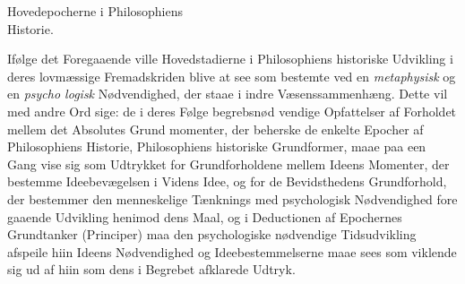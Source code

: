 \begin{center}
{\Large Hovedepocherne i Philosophiens\\
Historie.}
\end{center}

Ifølge det Foregaaende ville Hovedstadierne i Philosophiens
historiske Udvikling i deres lovmæssige Fremadskriden blive
at see som bestemte ved en \emph{metaphysisk} og en \emph{psycho\-%
logisk} Nødvendighed, der staae i indre Væsenssammenhæng.
Dette vil med andre Ord sige: de i deres Følge begrebsnød\-%
vendige Opfattelser af Forholdet mellem det Absolutes Grund\-%
momenter, der beherske de enkelte Epocher af Philosophiens
Historie, Philosophiens historiske Grundformer, maae paa een
Gang vise sig som Udtrykket for Grundforholdene mellem
Ideens Momenter, der bestemme Ideebevægelsen i Videns Idee,
og for de Bevidsthedens Grundforhold, der bestemmer den
menneskelige Tænknings med psychologisk Nødvendighed fore\-%
gaaende Udvikling henimod dens Maal, og i Deductionen af
Epochernes Grundtanker (Principer) maa den psychologiske
nødvendige Tidsudvikling afspeile hiin Ideens Nødvendighed
og Ideebestemmelserne maae sees som viklende sig ud af hiin
som dens i Begrebet afklarede Udtryk.

